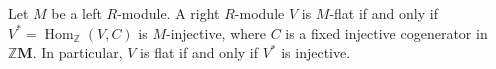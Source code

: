 Let $M$ be a left $R$-module. A right $R$-module $V$ is $M$-flat if and only if $V^* = \operatorname{Hom}_{\mathbb{Z}}(V, C)$ is $M$-injective, where $C$ is a fixed injective cogenerator in $\mathbb{Z}\mathbf{M}$. In particular, $V$ is flat if and only if $V^*$ is injective.
